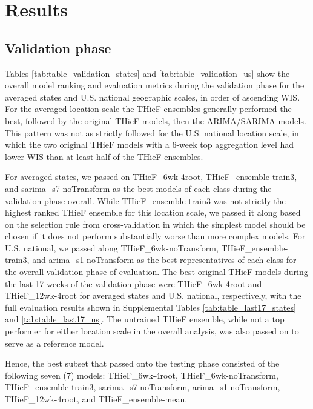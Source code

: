 \documentclass[thesis]{umassthesis}  %
\begin{document}
\chapter{Results} \label{results}
\section{Validation phase} \label{validation_results}
Tables \ref{tab:table_validation_states} and \ref{tab:table_validation_us} show the overall model ranking and evaluation metrics during the validation phase for the averaged states and U.S. national geographic scales, in order of ascending WIS. For the averaged location scale the THieF ensembles generally performed the best, followed by the original THieF models, then the ARIMA/SARIMA models. This pattern was not as strictly followed for the U.S. national location scale, in which the two original THieF models with a 6-week top aggregation level had lower WIS than at least half of the THieF ensembles.

For averaged states, we passed on THieF\_6wk-4root, THieF\_ensemble-train3, and sarima\_s7-noTransform as the best models of each class during the validation phase overall. While THieF\_ensemble-train3 was not strictly the highest ranked THieF ensemble for this location scale, we passed it along based on the selection rule from cross-validation in which the simplest model should be chosen if it does not perform substantially worse than more complex models. For U.S. national, we passed along THieF\_6wk-noTransform, THieF\_ensemble-train3, and arima\_s1-noTransform as the best representatives of each class for the overall validation phase of evaluation. The best original THieF models during the last 17 weeks of the validation phase were THieF\_6wk-4root and THieF\_12wk-4root for averaged states and U.S. national, respectively, with the full evaluation results shown in Supplemental Tables \ref{tab:table_last17_states} and \ref{tab:table_last17_us}. The untrained THieF ensemble, while not a top performer for either location scale in the overall analysis, was also passed on to serve as a reference model.

Hence, the best subset that passed onto the testing phase consisted of the following seven (7) models: THieF\_6wk-4root, THieF\_6wk-noTransform, THieF\_ensemble-train3, sarima\_s7-noTransform, arima\_s1-noTransform, THieF\_12wk-4root, and \newline THieF\_ensemble-mean.
\end{document}
